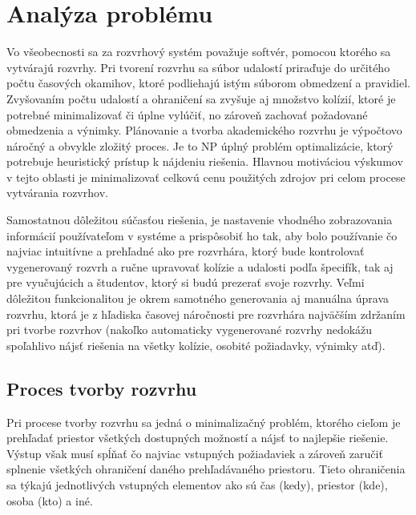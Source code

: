 \section{Analýza problému}
\label{sec:analysis}

Vo všeobecnosti sa za rozvrhový systém považuje softvér, pomocou ktorého
sa vytvárajú rozvrhy. Pri tvorení rozvrhu sa súbor udalostí priraďuje do určitého
počtu časových okamihov, ktoré podliehajú istým súborom obmedzení a pravidiel.
Zvyšovaním počtu udalostí a ohraničení sa zvyšuje aj množstvo kolízií, ktoré je
potrebné minimalizovať či úplne vylúčiť, no zároveň zachovať požadované
obmedzenia a výnimky. Plánovanie a tvorba akademického rozvrhu je výpočtovo
náročný a obvykle zložitý proces. Je to NP úplný problém optimalizácie, ktorý
potrebuje heuristický prístup k nájdeniu riešenia. Hlavnou motiváciou výskumov
v tejto oblasti je minimalizovať celkovú cenu použitých zdrojov pri celom procese
vytvárania rozvrhov.

Samostatnou dôležitou súčasťou riešenia, je nastavenie vhodného zobrazovania
informácií používateľom v systéme a prispôsobiť ho tak, aby bolo používanie čo
najviac intuitívne a prehľadné ako pre rozvrhára, ktorý bude kontrolovať
vygenerovaný rozvrh a ručne upravovať kolízie a udalosti podľa špecifík, tak aj pre
vyučujúcich a študentov, ktorý si budú prezerať svoje rozvrhy. Veľmi dôležitou
funkcionalitou je okrem samotného generovania aj manuálna úprava rozvrhu, ktorá
je z hľadiska časovej náročnosti pre rozvrhára najväčším zdržaním pri tvorbe rozvrhov
(nakoľko automaticky vygenerované rozvrhy nedokážu spoľahlivo nájsť riešenia na
všetky kolízie, osobité požiadavky, výnimky atď).
\subsection{Proces tvorby rozvrhu}
\label{subsec:timetabling}

Pri procese tvorby rozvrhu sa jedná o minimalizačný problém, ktorého cieľom je
prehľadať priestor všetkých dostupných možností a nájsť to najlepšie riešenie.
Výstup však musí spĺňať čo najviac vstupných požiadaviek a zároveň zaručiť
splnenie všetkých ohraničení daného prehľadávaného priestoru. Tieto ohraničenia
sa týkajú jednotlivých vstupných elementov ako sú čas (kedy), priestor (kde),
osoba (kto) a iné. \cite{willemen}

